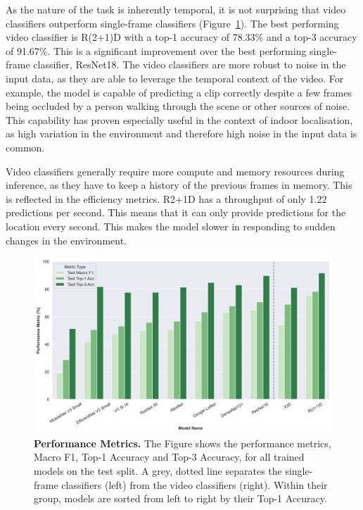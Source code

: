 \documentclass[a4paper]{article}
\begin{document}
As the nature of the task is inherently temporal, it is not surprising that
video classifiers outperform single-frame classifiers
(Figure~\ref{fig:performance-metrics}). The best performing video classifier is
R(2+1)D with a top-1 accuracy of 78.33\% and a top-3 accuracy of 91.67\%. This
is a significant improvement over the best performing single-frame classifier,
ResNet18. The video classifiers are more robust to noise in the input data, as
they are able to leverage the temporal context of the video. For example, the
model is capable of predicting a clip correctly despite a few frames being
occluded by a person walking through the scene or other sources of noise. This
capability has proven especially useful in the context of indoor localisation,
as high variation in the environment and therefore high noise in the input
data is common.

Video classifiers generally require more compute and memory resources during
inference, as they have to keep a history of the previous frames in memory.
This is reflected in the efficiency metrics. R2+1D has a throughput of only
1.22 predictions per second. This means that it can only provide predictions
for the location every second. This makes the model slower in responding to
sudden changes in the environment.


\begin{figure}
  \begin{center}
    \includegraphics[width=.95\textwidth]
    {./figures/performance-metrics.png}
  \end{center}

  \caption{\textbf{Performance Metrics.} The Figure shows the performance
    metrics, Macro F1, Top-1 Accuracy and Top-3 Accuracy, for all trained
    models on the test split. A grey, dotted line separates the single-frame
    classifiers (left) from the video classifiers (right). Within their group,
    models are sorted from left to right by their Top-1 Accuracy.}

  \label{fig:performance-metrics}
\end{figure}
\end{document}
